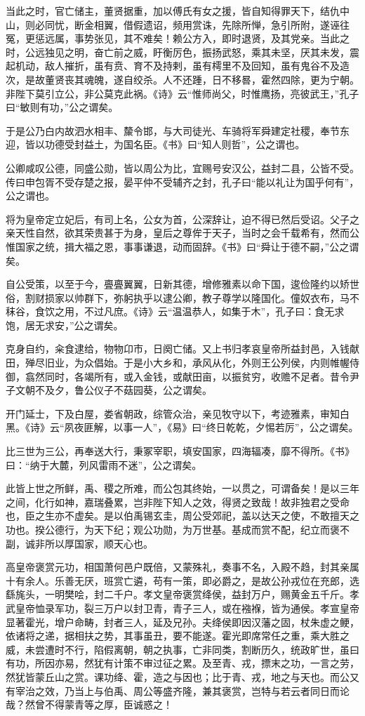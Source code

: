 \documentclass[]{article}
\begin{document}
当此之时，官亡储主，董贤据重，加以傅氏有女之援，皆自知得罪天下，结仇中山，则必同忧，断金相翼，借假遗诏，频用赏诛，先除所惮，急引所附，遂诬往冤，更惩远属，事势张见，其不难矣！赖公方入，即时退贤，及其党亲。当此之时，公远独见之明，奋亡前之威，盱衡厉色，振扬武怒，乘其未坚，厌其未发，震起机动，敌人摧折，虽有贲、育不及持剌，虽有樗里不及回知，虽有鬼谷不及造次，是故董贤丧其魂魄，遂自绞杀。人不还踵，日不移晷，霍然四除，更为宁朝。非陛下莫引立公，非公莫克此祸。《诗》云``惟师尚父，时惟鹰扬，亮彼武王，''孔子曰``敏则有功，''公之谓矣。

于是公乃白内故泗水相丰、斄令邯，与大司徒光、车骑将军舜建定社稷，奉节东迎，皆以功德受封益土，为国名臣。《书》曰``知人则哲''，公之谓也。

公卿咸叹公德，同盛公勋，皆以周公为比，宜赐号安汉公，益封二县，公皆不受。传曰申包胥不受存楚之报，晏平仲不受辅齐之封，孔子曰``能以礼让为国乎何有''，公之谓也。

将为皇帝定立妃后，有司上名，公女为首，公深辞让，迫不得已然后受诏。父子之亲天性自然，欲其荣贵甚于为身，皇后之尊侔于天子，当时之会千载希有，然而公惟国家之统，揖大福之恩，事事谦退，动而固辞。《书》曰``舜让于德不嗣，''公之谓矣。

自公受策，以至于今，亹亹翼翼，日新其德，增修雅素以命下国，逡俭隆约以矫世俗，割财损家以帅群下，弥躬执乎以逮公卿，教子尊学以隆国化。僮奴衣布，马不秣谷，食饮之用，不过凡庶。《诗》云``温温恭人，如集于木''，孔子曰：食无求饱，居无求安，''公之谓矣。

克身自约，籴食逮给，物物卬市，日阕亡储。又上书归孝哀皇帝所益封邑，入钱献田，殚尽旧业，为众倡始。于是小大乡和，承风从化，外则王公列侯，内则帷幄侍御，翕然同时，各竭所有，或入金钱，或献田亩，以振贫穷，收赡不足者。昔令尹子文朝不及夕，鲁公仪子不菇园葵，公之谓矣。

开门延士，下及白屋，娄省朝政，综管众治，亲见牧守以下，考迹雅素，审知白黑。《诗》云``夙夜匪解，以事一人''，《易》曰``终日乾乾，夕惕若厉''，公之谓矣。

比三世为三公，再奉送大行，秉冢宰职，填安国家，四海辐凑，靡不得所。《书》曰：``纳于大麓，列风雷雨不迷''，公之谓矣。

此皆上世之所鲜，禹、稷之所难，而公包其终始，一以贯之，可谓备矣！是以三年之间，化行如神，嘉瑞叠累，岂非陛下知人之效，得贤之致哉！故非独君之受命也，臣之生亦不虚矣。是以伯禹锡玄圭，周公受郊祀，盖以达天之使，不敢擅天之功也。揆公德行，为天下纪；观公功勋，为万世基。基成而赏不配，纪立而褒不副，诚非所以厚国家，顺天心也。

高皇帝褒赏元功，相国萧何邑户既倍，又蒙殊礼，奏事不名，入殿不趋，封其亲属十有余人。乐善无厌，班赏亡遴，苟有一策，即必爵之，是故公孙戎位在充郎，选繇旄头，一明樊哙，封二千户。孝文皇帝褒赏绛侯，益封万户，赐黄金五千斤。孝武皇帝恤录军功，裂三万户以封卫青，青子三人，或在襁褓，皆为通侯。孝宣皇帝显著霍光，增户命畴，封者三人，延及兄孙。夫绛侯即因汉藩之固，杖朱虚之鲠，依诸将之递，据相扶之势，其事虽丑，要不能遂。霍光即席常任之重，乘大胜之威，未尝遭时不行，陷假离朝，朝之执事，亡非同类，割断历久，统政旷世，虽曰有功，所因亦易，然犹有计策不审过征之累。及至青、戎，摽末之功，一言之劳，然犹皆蒙丘山之赏。课功绛、霍，造之与因也；比于青、戎，地之与天也。而公又有宰治之效，乃当上与伯禹、周公等盛齐隆，兼其褒赏，岂特与若云者同日而论哉？然曾不得蒙青等之厚，臣诚惑之！
\end{document}
